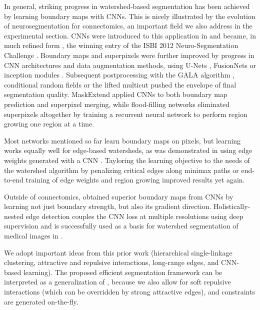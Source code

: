 In general, striking progress in watershed-based segmentation has been achieved by learning boundary maps with CNNs. This is nicely illustrated by the evolution of neurosegmentation for connectomics, an important field we also address in the experimental section. CNNs were introduced to this application in \cite{jain2007supervised} and became, in much refined form \cite{ciresan_12_deep-em-segmentation}, the winning entry of the ISBI 2012 Neuro-Segmentation Challenge \cite{isbi2012challenge}. Boundary maps and superpixels were further improved by progress in CNN architectures and data augmentation methods, using U-Nets \cite{ronneberger_15_u-net}, FusionNets \cite{quan2016fusionnet} or inception modules \cite{beier2017multicut}. Subsequent postprocessing with the GALA algorithm \cite{GALA,knowles2016rhoananet}, conditional random fields \cite{uzunbacs_14_optree} or the lifted multicut \cite{beier2017multicut} pushed the envelope of final segmentation quality. MaskExtend \cite{meirovitch2016multi} applied CNNs to both boundary map prediction and superpixel merging, while flood-filling networks \cite{floodfill} eliminated superpixels altogether by training a recurrent neural network to perform region growing one region at a time.

Most networks mentioned so far learn boundary maps on pixels, but learning works equally well for edge-based watersheds, as was demonstrated in \cite{zlateski2015image,parag2017anisotropic} using edge weights generated with a CNN \cite{turaga2010convolutional,MALIS}. Tayloring the learning objective to the needs of the watershed algorithm by penalizing critical edges along minimax paths \cite{MALIS} or end-to-end training of edge weights and region growing \cite{wolf2017learned} improved results yet again.

Outside of connectomics, \cite{bai2016deep_watershed} obtained superior boundary maps from CNNs by learning not just boundary strength, but also its gradient direction. Holistically-nested edge detection \cite{xie2015holistically,kokkinos2015pushing} couples the CNN loss at multiple resolutions using deep supervision and is successfully used as a basis for watershed segmentation of medical images in \cite{cai2016pancreas}. 

We adopt important ideas from this prior work (hierarchical single-linkage clustering, attractive and repulsive interactions, long-range edges, and CNN-based learning). The proposed efficient segmentation framework can be interpreted as a generalization of \cite{malmberg2011generalized}, because we also allow for soft repulsive interactions (which can be overridden by strong attractive edges), and constraints are generated on-the-fly.
